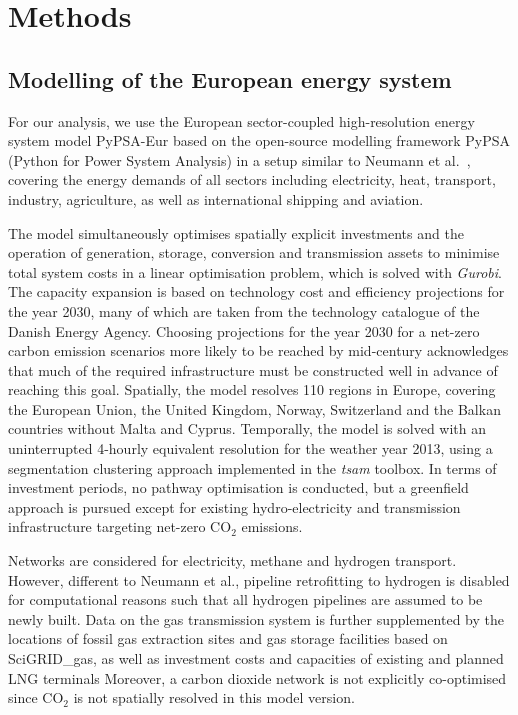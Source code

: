 \documentclass[5p,10pt]{elsarticle}
\begin{document}
\section*{Methods}
\label{sec:methods}



\subsection*{Modelling of the European energy system}

For our analysis, we use the European sector-coupled high-resolution energy
system model PyPSA-Eur\cite{horschPyPSAEurOpen2018a} based on the open-source
modelling framework PyPSA\cite{brownPyPSAPython2018} (Python for Power System
Analysis) in a setup similar to Neumann et al.~\cite{neumannPotentialRole2023},
covering the energy demands of all sectors including electricity, heat,
transport, industry, agriculture, as well as international shipping and
aviation.

The model simultaneously optimises spatially explicit investments and the
operation of generation, storage, conversion and transmission assets to minimise
total system costs in a linear optimisation problem, which is solved with
\textit{Gurobi}.\cite{gurobi} The capacity expansion is based on technology cost
and efficiency projections for the year 2030, many of which are taken from the
technology catalogue of the Danish Energy Agency.\cite{DEA} Choosing projections
for the year 2030 for a net-zero carbon emission scenarios more likely to be
reached by mid-century acknowledges that much of the required infrastructure
must be constructed well in advance of reaching this goal. Spatially, the model
resolves 110 regions in Europe,\cite{frysztackiStrongEffect2021} covering the
European Union, the United Kingdom, Norway, Switzerland and the Balkan countries
without Malta and Cyprus. Temporally, the model is solved with an uninterrupted
4-hourly equivalent resolution for the weather year 2013, using a segmentation
clustering approach implemented in the \textit{tsam}
toolbox.\cite{hoffmannParetooptimalTemporal2022} In terms of investment periods,
no pathway optimisation is conducted, but a greenfield approach is pursued
except for existing hydro-electricity and transmission infrastructure targeting
net-zero CO$_2$ emissions.

Networks are considered for electricity, methane and hydrogen
transport.\cite{ENTSOE,plutaSciGRIDGas2022a} However, different to Neumann et
al.,\cite{neumannPotentialRole2023} pipeline retrofitting to hydrogen is
disabled for computational reasons such that all hydrogen pipelines are assumed
to be newly built. Data on the gas transmission system is further supplemented
by the locations of fossil gas extraction sites and gas storage facilities based
on SciGRID\_gas,\cite{plutaSciGRIDGas2022a} as well as investment costs and
capacities of existing and planned LNG
terminals\cite{instituteforenergyeconomicsandfinancialanalysisEuropeanLNG2023}
Moreover, a carbon dioxide network is not explicitly co-optimised since CO$_2$
is not spatially resolved in this model version.\cite{hofmannDesigningCO22023}
\end{document}
